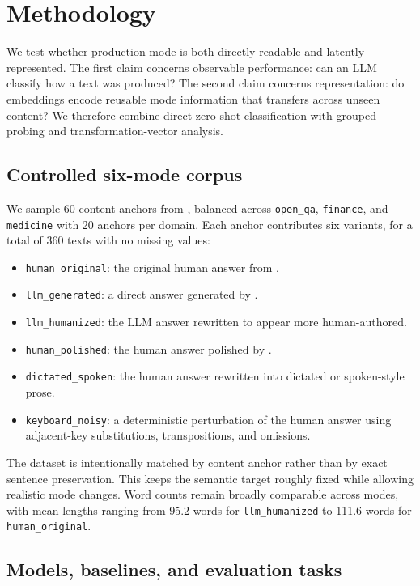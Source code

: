 \section{Methodology}
\label{sec:methodology}

 We test whether production mode is both directly readable and latently represented. The first claim concerns observable performance: can an LLM classify how a text was produced? The second claim concerns representation: do embeddings encode reusable mode information that transfers across unseen content? We therefore combine direct zero-shot classification with grouped probing and transformation-vector analysis.

\subsection{Controlled six-mode corpus}

We sample 60 content anchors from \hcthree, balanced across \texttt{open\_qa}, \texttt{finance}, and \texttt{medicine} with 20 anchors per domain. Each anchor contributes six variants, for a total of 360 texts with no missing values:
\begin{itemize}[leftmargin=*,itemsep=0pt,topsep=2pt]
    \item \texttt{human\_original}: the original human answer from \hcthree.
    \item \texttt{llm\_generated}: a direct answer generated by \gptfourone.
    \item \texttt{llm\_humanized}: the LLM answer rewritten to appear more human-authored.
    \item \texttt{human\_polished}: the human answer polished by \gptfourone.
    \item \texttt{dictated\_spoken}: the human answer rewritten into dictated or spoken-style prose.
    \item \texttt{keyboard\_noisy}: a deterministic perturbation of the human answer using adjacent-key substitutions, transpositions, and omissions.
\end{itemize}

The dataset is intentionally matched by content anchor rather than by exact sentence preservation. This keeps the semantic target roughly fixed while allowing realistic mode changes. Word counts remain broadly comparable across modes, with mean lengths ranging from 95.2 words for \texttt{llm\_humanized} to 111.6 words for \texttt{human\_original}.

\subsection{Models, baselines, and evaluation tasks}

